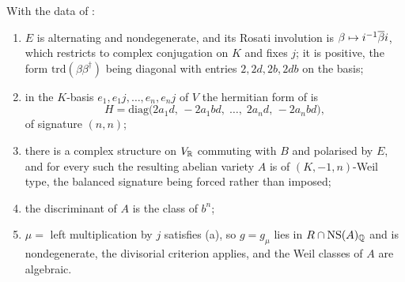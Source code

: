 \begin{theorem}\label{thm:quatweil}
With the data of :
\begin{enumerate}[label=\textup{(\roman*)},nosep]
\item $E$ is alternating and nondegenerate, and its Rosati involution is
  $\beta\mapsto i^{-1}\overline{\beta}i$, which restricts to complex conjugation on
  $K$ and fixes $j$; it is positive, the form $\mathrm{trd}(\beta\beta^{\dagger})$
  being diagonal with entries $2,2d,2b,2db$ on the basis;
\item in the $K$-basis $e_{1},e_{1}j,\dots,e_{n},e_{n}j$ of $V$ the hermitian
  form of  is
  \[
    H=\mathrm{diag}\bigl(2a_{1}d,\,-2a_{1}bd,\;\dots,\;2a_{n}d,\,-2a_{n}bd\bigr),
  \]
  of signature $(n,n)$;
\item there is a complex structure on $V_{\mathbb{R}}$ commuting with $B$ and
  polarised by $E$, and for every such the resulting abelian variety $A$ is of
  $(K,-1,n)$-Weil type, the balanced signature being forced rather than
  imposed;
\item the discriminant of $A$ is the class of $b^{n}$;
\item $\mu=$ left multiplication by $j$ satisfies (a),
  so $g=g_{\mu}$ lies in $R\cap\mathrm{NS}(A)_{\mathbb{Q}}$ and is nondegenerate, the
  divisorial criterion  applies, and the Weil classes
  of $A$ are algebraic.
\end{enumerate}
\end{theorem}

